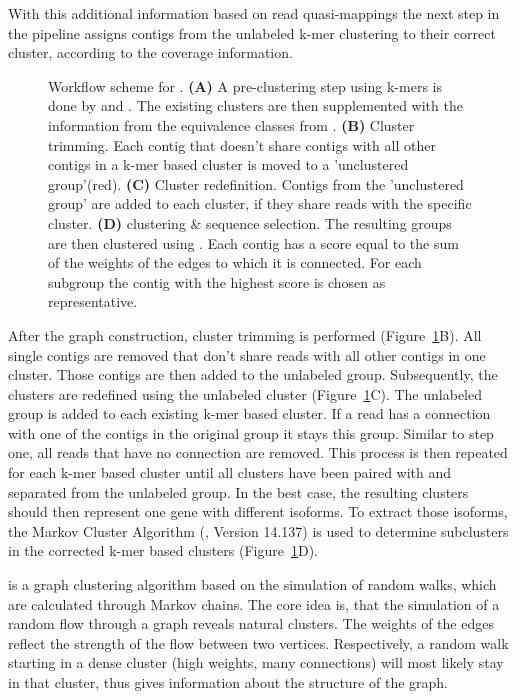\documentclass[12pt,a4paper,english]{article}
\begin{document}
	\noindent
	With this additional information based on read quasi-mappings the next step in the pipeline assigns contigs from the unlabeled k-mer clustering to their correct cluster, according to the coverage information.
	
	\begin{figure}[H]
		\centering
		\def\svgwidth{\textwidth}
		
		\caption[Workflow scheme of \karma.]{\label{img:karma_workflow} Workflow scheme for \karma. \textbf{(A)} A pre-clustering step using k-mers is done by \umap and \hdbscan. The existing clusters are then supplemented with the information from the equivalence classes from \salmon.
			\textbf{(B)} Cluster trimming. Each contig that doesn't share contigs with all other contigs in a k-mer based cluster is moved to a 'unclustered group'(red).
			\textbf{(C)} Cluster redefinition. Contigs from the 'unclustered group' are added to each cluster, if they share reads with the specific cluster.
			\textbf{(D)} \mcl clustering \& sequence selection. The resulting groups are then clustered using \mcl. Each contig has a score equal to the sum of the weights of the edges to which it is connected. For each subgroup the contig with the highest score is chosen as representative.}
	\end{figure} 
	
	After the graph construction, cluster trimming is performed (Figure~\ref{img:karma_workflow}B). All single contigs are removed that don't share reads with all other contigs in one cluster. Those contigs are then added to the unlabeled group.
	Subsequently, the clusters are redefined using the unlabeled cluster (Figure~\ref{img:karma_workflow}C). The unlabeled group is added to each existing k-mer based cluster. If a read has a connection with one of the contigs in the original group it stays this group. Similar to step one, all reads that have no connection are removed. This process is then repeated for each k-mer based cluster until all clusters have been paired with and separated from the unlabeled group.
	In the best case, the resulting clusters should then represent one gene with different isoforms. To extract those isoforms, the Markov Cluster Algorithm (\mcl, Version 14.137) \citep{mcl:00} is used to determine subclusters in the corrected k-mer based clusters (Figure~\ref{img:karma_workflow}D).
	
	\mcl is a graph clustering algorithm based on the simulation of random walks, which are calculated through Markov chains. The core idea is, that the simulation of a random flow through a graph reveals natural clusters. The weights of the edges reflect the strength of the flow between two vertices. Respectively, a random walk starting in a dense cluster (high weights, many connections) will most likely stay in that cluster, thus gives information about the structure of the graph.
	
\end{document}

